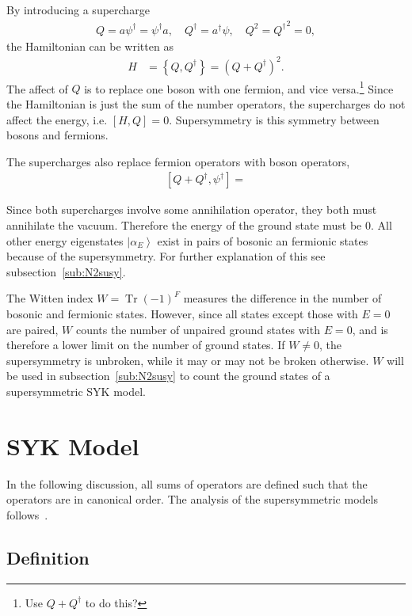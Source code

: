 \documentclass[12pt]{article} %
\newcommand{\ket}[1]{\left|#1\right\rangle}
\newcommand{\comm}[2]{\left[#1,#2\right]}
\newcommand{\acom}[2]{\left\{#1,#2\right\}}
\DeclareMathOperator{\Tr}{Tr}
\begin{document}
By introducing a supercharge 
\begin{align}
Q = a\psi^\dag = \psi^\dag a,\quad Q^\dag = a^\dag\psi,\quad Q^2 ={ Q^\dag}^2 
	= 0,
\end{align}
the Hamiltonian can be written as 
\begin{align}
H &= \acom{Q}{Q^\dag} = \left(Q+Q^\dag \right)^2.
\end{align}
The affect of $Q$ is to replace one boson with one fermion, and vice versa.\footnote{Use $Q+Q^\dag$ to do this?} Since the Hamiltonian is just the sum of the number operators, the supercharges do not affect the energy, i.e. $\comm{H}{Q} = 0$. Supersymmetry is this symmetry between bosons and fermions.

The supercharges also replace fermion operators with boson operators,
\begin{align}
\comm{Q+Q^\dag }{\psi^\dag} = 
\end{align}

Since both supercharges involve some annihilation operator, they both must annihilate the vacuum. Therefore the energy of the ground state must be 0. All other energy eigenstates $\ket{\alpha_E}$ exist in pairs of bosonic an fermionic states because of the supersymmetry. For further explanation of this see subsection~\ref{sub:N2susy}.

The Witten index $W = \Tr(-1)^F$ measures the difference in the number of bosonic and fermionic states. However, since all states except those with $E=0$ are paired, $W$ counts the number of unpaired ground states with $E=0$, and is therefore a lower limit on the number of ground states. If $W\ne0$, the supersymmetry is unbroken, while it may or may not be broken otherwise. $W$ will be used in subsection~\ref{sub:N2susy} to count the ground states of a supersymmetric SYK model.

\section{SYK Model} \label{sec:syk}

In the following discussion, all sums of operators are defined such that the operators are in canonical order. The analysis of the supersymmetric models follows~\cite{fu16}.

\subsection{Definition} \emph{} \label{sub:syk_def}
\end{document}
